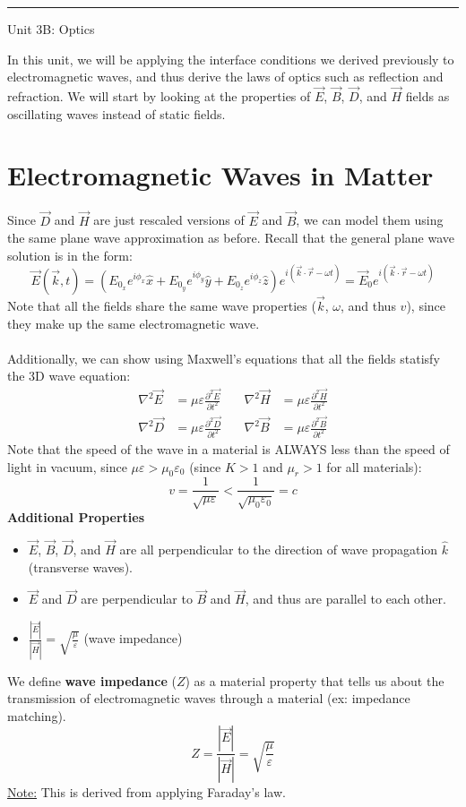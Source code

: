 \documentclass[12pt]{article}
\begin{document}
\vspace{1em}
\noindent\hrule
\vspace{1em}
\newpage
\begin{center}
   {\LARGE Unit 3B: Optics\par} 
\end{center}
In this unit, we will be applying the interface conditions we derived previously to electromagnetic waves, and thus derive the laws of optics such as reflection and refraction. We will start by looking at the properties of $\vec{E}$, $\vec{B}$, $\vec{D}$, and $\vec{H}$ fields as oscillating waves instead of static fields.
\section*{Electromagnetic Waves in Matter}
Since $\vec{D}$ and $\vec{H}$ are just rescaled versions of $\vec{E}$ and $\vec{B}$, we can model them using the same plane wave approximation as before. Recall that the general plane wave solution is in the form:
\[\vec{E}(\vec{k},t) = \left(E_{0_x}e^{i\phi_x}\hat{x} + E_{0_y}e^{i\phi_y}\hat{y} + E_{0_z}e^{i\phi_z}\hat{z}\right)e^{i(\vec{k}\cdot\vec{r} - \omega t)} = \vec{E}_0 e^{i(\vec{k}\cdot\vec{r} - \omega t)}\]
Note that all the fields share the same wave properties ($\vec{k}$, $\omega$, and thus $v$), since they make up the same electromagnetic wave.\\\\
Additionally, we can show using Maxwell's equations that all the fields statisfy the 3D wave equation:
\[\begin{aligned}
\nabla^2 \vec{E} &= \mu \varepsilon \frac{\partial^2 \vec{E}}{\partial t^2} & \quad \nabla^2 \vec{H} &= \mu \varepsilon \frac{\partial^2 \vec{H}}{\partial t^2} \\[15pt]
\nabla^2 \vec{D} &= \mu \varepsilon \frac{\partial^2 \vec{D}}{\partial t^2} & \quad \nabla^2 \vec{B} &= \mu \varepsilon \frac{\partial^2 \vec{B}}{\partial t^2}
\end{aligned}\]
Note that the speed of the wave in a material is ALWAYS less than the speed of light in vacuum, since $\mu \varepsilon > \mu_0 \varepsilon_0$ (since $K > 1$ and $\mu_r > 1$ for all materials):
\[v = \frac{1}{\sqrt{\mu \varepsilon}} < \frac{1}{\sqrt{\mu_0 \varepsilon_0}} = c\]
\textbf{Additional Properties}\\
\begin{itemize}
    \item $\vec{E}$, $\vec{B}$, $\vec{D}$, and $\vec{H}$ are all perpendicular to the direction of wave propagation $\hat{k}$ (transverse waves).
    \item $\vec{E}$ and $\vec{D}$ are perpendicular to $\vec{B}$ and $\vec{H}$, and thus are parallel to each other.
    \item $\frac{|\vec{E}|}{|\vec{H}|} = \sqrt{\frac{\mu}{\varepsilon}}$ (wave impedance)
\end{itemize}
We define \textbf{wave impedance} ($Z$) as a material property that tells us about the transmission of electromagnetic waves through a material (ex: impedance matching).
\[\boxed{Z =\frac{|\vec{E}|}{|\vec{H}|} = \sqrt{\frac{\mu}{\varepsilon}}}\]
\underline{Note:} This is derived from applying Faraday's law.
\end{document}
